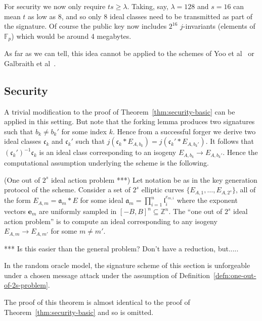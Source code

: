 \documentclass{llncs}
\newcommand{\F}{\mathbb{F}}
\newcommand{\Z}{\mathbb{Z}}
\renewcommand{\a}{\mathfrak{a}}
\renewcommand{\c}{\mathfrak{c}}
\renewcommand{\l}{\mathfrak{l}}
\newcommand{\e}{\textbf{e}}
\begin{document}
For security we now only require $ts \ge \lambda$. Taking, say, $\lambda = 128$ and $s = 16$ can mean $t$ as low as 8, and so only 8 ideal classes need to be transmitted as part of the signature.
Of course the public key now includes $2^{16}$ $j$-invariants (elements of $\F_p$) which would be around 4 megabytes.


As far as we can tell, this idea cannot be applied to the schemes of Yoo et al~\cite{YAJJS17} or Galbraith et al~\cite{GPS17}.



\subsection{Security}

A trivial modification to the proof of Theorem~\ref{thm:security-basic} can be applied in this setting. But note that the forking lemma produces two signatures such that $b_k \ne b_k'$ for some index $k$.
Hence from a successful forger we derive two ideal classes $\c_k$ and $\c_k'$ such that $j( \c_k * E_{A, b_k} ) = j( \c_k' * E_{A, b_k'})$. It follows that $(\c_k')^{-1} \c_k$ is an ideal class corresponding to an isogeny $E_{A,b_k} \to E_{A,b_k'}$.
Hence the computational assumption underlying the scheme is the following.

\begin{definition}\label{defn:one-out-of-2s-problem}
(One out of $2^s$ ideal action problem ***)
Let notation be as in the key generation protocol of the scheme.
Consider a set of $2^s$ elliptic curves $\{ E_{A,1}, \dots, E_{A,2^s} \}$, all of the form $E_{A,m} = \a_m * E$ for some ideal $\a_m = \prod_{i=1}^n \l_i^{e_{m,i}}$ where the exponent vectors $\e_m $ are uniformly sampled in $[-B,B]^n \subseteq \Z^n$. The ``one out of $2^s$ ideal action problem'' is to compute an ideal corresponding to any isogeny $E_{A,m} \to E_{A,m'}$ for some $m \ne m'$.
\end{definition}


*** Is this easier than the general problem?  Don't have a reduction, but.....


\begin{theorem}
In the random oracle model, the signature scheme of this section is unforgeable under a chosen message attack under the assumption of Definition~\ref{defn:one-out-of-2s-problem}.
\end{theorem}

The proof of this theorem is almost identical to the proof of Theorem~\ref{thm:security-basic} and so is omitted.
\end{document}
